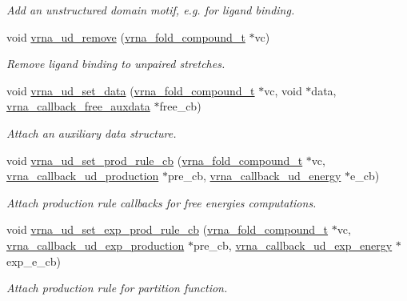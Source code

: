 \begin{DoxyCompactItemize}
\begin{DoxyCompactList}\small\item\em Add an unstructured domain motif, e.\+g. for ligand binding. \end{DoxyCompactList}\item 
void \mbox{\hyperlink{group__domains__up_gada59cb0c498b812eadd010811af3f2d4}{vrna\+\_\+ud\+\_\+remove}} (\mbox{\hyperlink{group__fold__compound_ga1b0cef17fd40466cef5968eaeeff6166}{vrna\+\_\+fold\+\_\+compound\+\_\+t}} $\ast$vc)
\begin{DoxyCompactList}\small\item\em Remove ligand binding to unpaired stretches. \end{DoxyCompactList}\item 
void \mbox{\hyperlink{group__domains__up_gac1f18c312b91d80089534a87d956e58b}{vrna\+\_\+ud\+\_\+set\+\_\+data}} (\mbox{\hyperlink{group__fold__compound_ga1b0cef17fd40466cef5968eaeeff6166}{vrna\+\_\+fold\+\_\+compound\+\_\+t}} $\ast$vc, void $\ast$data, \mbox{\hyperlink{group__fold__compound_ga7806651f51b195013839a218b3bbd5a3}{vrna\+\_\+callback\+\_\+free\+\_\+auxdata}} $\ast$free\+\_\+cb)
\begin{DoxyCompactList}\small\item\em Attach an auxiliary data structure. \end{DoxyCompactList}\item 
void \mbox{\hyperlink{group__domains__up_ga745a99f0bc72898d54de16f6e538828a}{vrna\+\_\+ud\+\_\+set\+\_\+prod\+\_\+rule\+\_\+cb}} (\mbox{\hyperlink{group__fold__compound_ga1b0cef17fd40466cef5968eaeeff6166}{vrna\+\_\+fold\+\_\+compound\+\_\+t}} $\ast$vc, \mbox{\hyperlink{group__domains__up_ga4fdfc02c1b660c07f2d887772f02a0a1}{vrna\+\_\+callback\+\_\+ud\+\_\+production}} $\ast$pre\+\_\+cb, \mbox{\hyperlink{group__domains__up_ga75825c57d0bfde4ae4f95c044260c5c3}{vrna\+\_\+callback\+\_\+ud\+\_\+energy}} $\ast$e\+\_\+cb)
\begin{DoxyCompactList}\small\item\em Attach production rule callbacks for free energies computations. \end{DoxyCompactList}\item 
void \mbox{\hyperlink{group__domains__up_ga2fb1db2099da26c76247e1209ad4aa09}{vrna\+\_\+ud\+\_\+set\+\_\+exp\+\_\+prod\+\_\+rule\+\_\+cb}} (\mbox{\hyperlink{group__fold__compound_ga1b0cef17fd40466cef5968eaeeff6166}{vrna\+\_\+fold\+\_\+compound\+\_\+t}} $\ast$vc, \mbox{\hyperlink{group__domains__up_ga33d78327dcd04c1ca5ab2887edc18c7b}{vrna\+\_\+callback\+\_\+ud\+\_\+exp\+\_\+production}} $\ast$pre\+\_\+cb, \mbox{\hyperlink{group__domains__up_ga861706f257ba993753464b823e65b86e}{vrna\+\_\+callback\+\_\+ud\+\_\+exp\+\_\+energy}} $\ast$exp\+\_\+e\+\_\+cb)
\begin{DoxyCompactList}\small\item\em Attach production rule for partition function. \end{DoxyCompactList}\end{DoxyCompactItemize}


